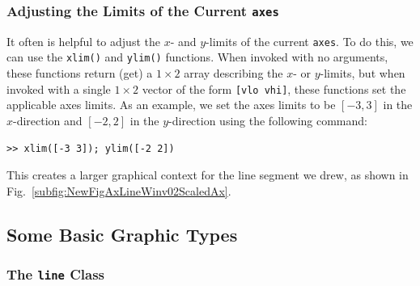 \subsubsection{Adjusting the Limits of the Current \texttt{axes}}
It often is helpful to adjust the $x$- and $y$-limits of the current \texttt{axes}.  To do this, we can use the \texttt{xlim()} and \texttt{ylim()} functions. When invoked with no arguments, these functions return (get) a $1\times2$ array describing the $x$- or $y$-limits, but when invoked with a single $1\times2$ vector of the form \verb![vlo vhi]!, these functions set the applicable axes limits.
As an example, we set the axes limits to be $[-3, 3]$ in the $x$-direction and $[-2, 2]$ in the $y$-direction using the following command:
\begin{lstlisting}[style=Matlab-editor,label=NewFigAxLinevSetAxLim,caption={A Command Window input to set the axes limits for the current \texttt{axes} object.}]
>> xlim([-3 3]); ylim([-2 2])
\end{lstlisting}
This creates a larger graphical context for the line segment we drew, as shown in Fig.\ \ref {subfig:NewFigAxLineWinv02ScaledAx}.

\subsection{Some Basic Graphic Types}

\subsubsection{The \texttt{line} Class}

